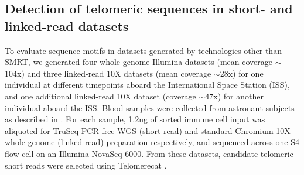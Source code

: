 \documentclass{article}
\begin{document}
\subsection*{Detection of telomeric sequences in short- and linked-read datasets} %
To evaluate sequence motifs in datasets generated by technologies other than SMRT, we generated four whole-genome Illumina datasets (mean coverage $\sim$104x) and three linked-read 10X datasets (mean coverage $\sim$28x) for one individual at different timepoints aboard the International Space Station (ISS), and one additional linked-read 10X dataset (coverage $\sim$47x) for another individual aboard the ISS.
Blood samples were collected from astronaut subjects as described in \cite{twins_study}. %
For each sample, 1.2ng of sorted immune cell input was aliquoted for TruSeq PCR-free WGS (short read) and standard Chromium 10X whole genome (linked-read) preparation respectively, and sequenced across one S4 flow cell on an Illumina NovaSeq 6000.
From these datasets, candidate telomeric short reads were selected using Telomerecat \cite{telomerecat}.
\end{document}

